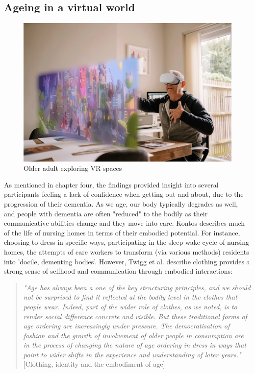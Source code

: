 \subsection{Ageing in a virtual world}
\label{FutureStudyOne}
\begin{figure}[htp]
\centering
\includegraphics[width=1\linewidth]{Images/Discussion/Aging_in_VR.png}
\caption{Older adult exploring VR spaces}
\label{fig:Aging_VR}
\end{figure}
As mentioned in chapter four, the findings provided insight into several participants feeling a lack of confidence when getting out and about, due to the progression of their dementia. As we age, our body typically degrades as well, and people with dementia are often "reduced" to the bodily as their communicative abilities change and they move into care. Kontos describes much of the life of nursing homes in terms of their embodied potential. For instance, choosing to dress in specific ways, participating in the sleep-wake cycle of nursing homes, the attempts of care workers to transform (via various methods) residents into 'docile, dementing bodies'. However, Twigg et al. describe clothing provides a strong sense of selfhood and communication through embodied interactions: 
\begin{quote}
\textit{"Age has always been a one of the key structuring principles, and we should not be surprised to find it reflected at the bodily level in the clothes that people wear. Indeed, part of the wider role of clothes, as we noted, is to render social difference concrete and visible. But these traditional forms of age ordering are increasingly under pressure. The democratisation of fashion and the growth of involvement of older people in consumption are in the process of changing the nature of age ordering in dress in ways that point to wider shifts in the experience and understanding of later years." }[Clothing, identity and the embodiment of age]
\end{quote}

